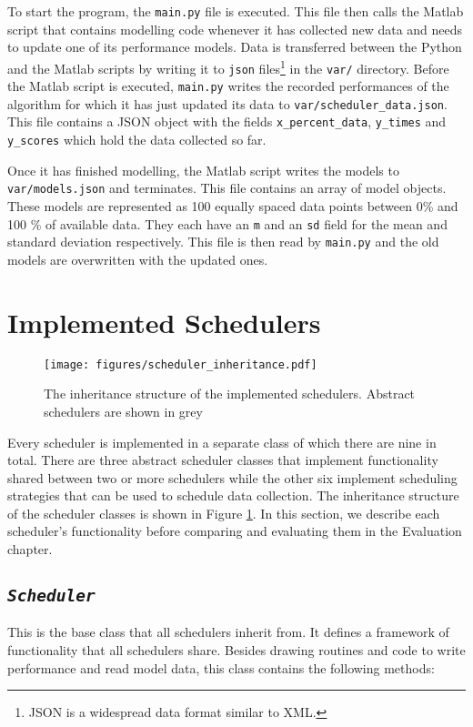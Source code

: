 \documentclass[a4paper,12pt,twoside,openright]{report}
\begin{document}
To start the program, the \texttt{main.py} file is executed. This file then calls the Matlab script that contains modelling code whenever it has collected new data and needs to update one of its performance models. Data is transferred between the Python and the Matlab scripts by writing it to \texttt{json} files\footnote{JSON is a widespread data format similar to XML.} in the \texttt{var/} directory.  Before the Matlab script is executed, \texttt{main.py} writes the recorded performances of the algorithm for which it has just updated its data to \texttt{var/scheduler\_data.json}. This file contains a JSON object with the fields \texttt{x\_percent\_data}, \texttt{y\_times} and \texttt{y\_scores} which hold the data collected so far.

Once it has finished modelling, the Matlab script writes the models to \texttt{var/models.json} and terminates. This file contains an array of model objects. These models are represented as 100 equally spaced data points between 0\% and 100 \% of available data. They each have an \texttt{m} and an \texttt{sd} field for the mean and standard deviation respectively. This file is then read by \texttt{main.py} and the old models are overwritten with the updated ones.


\section{Implemented Schedulers}
\begin{figure}
    \centerline{\texttt{[image: figures/scheduler\_inheritance.pdf]}}
  \caption{The inheritance structure of the implemented schedulers. Abstract schedulers are shown in grey}
    \label{schedulerinheritance}
\end{figure}

Every scheduler is implemented in a separate class of which there are nine in total. There are three abstract scheduler classes that implement functionality shared between two or more schedulers while the other six implement scheduling strategies that can be used to schedule data collection. The inheritance structure of the scheduler classes is shown in Figure \ref{schedulerinheritance}. In this section, we describe each scheduler's functionality before comparing and evaluating them in the Evaluation chapter.

\subsection{\texttt{\textit{Scheduler}}}
This is the base class that all schedulers inherit from. It defines a framework of functionality that all schedulers share. Besides drawing routines and code to write performance and read model data, this class contains the following methods:
\end{document}
